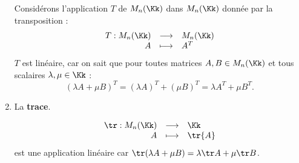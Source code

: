 \documentclass[class=report,crop=false]{standalone}
\begin{document}
\begin{enumerate}
Considérons l'application $T$ de $M_{n}(\Kk)$ dans $M_{n}(\Kk)$ donnée
par la transposition :
$$\begin{array}{rcl}
T : M_{n}(\Kk) & \longrightarrow & M_{n}(\Kk)\\
             A & \longmapsto & A^{T}
\end{array} $$
$T$ est linéaire, car on sait que pour toutes matrices $A,B \in M_{n}(\Kk)$ et
tous scalaires $\lambda,\mu \in \Kk$ :
$$(\lambda A + \mu B)^{T}=(\lambda A)^{T} + (\mu B)^{T}=\lambda A^{T} + \mu B^{T}.$$

  \item La \textbf{trace}.

$$\begin{array}{rcl}
\tr : M_{n}(\Kk) & \longrightarrow & \Kk\\
             A & \longmapsto & \tr{A}
\end{array} $$
est une application linéaire car
$\tr(\lambda A + \mu B) = \lambda \tr A + \mu \tr B$.


\end{enumerate}


\end{document}
